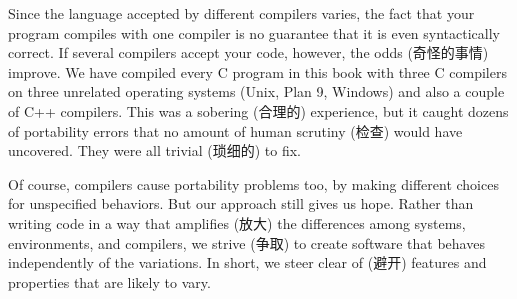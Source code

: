 Since the language accepted by different compilers varies, the fact that
your program compiles with one compiler is no guarantee that it is even
syntactically correct.  If several compilers accept your code, however, the
odds (奇怪的事情) improve. We have compiled every C program in this book
with three C compilers on three unrelated operating systems (Unix, Plan 9,
Windows) and also a couple of C++ compilers. This was a sobering (合理的)
experience, but it caught dozens of portability errors that no amount of
human scrutiny (检查) would have uncovered. They were all trivial (琐细的)
to fix.

Of course, compilers cause portability problems too, by making different
choices for unspecified behaviors. But our approach still gives us hope.
Rather than writing code in a way that amplifies (放大) the differences
among systems, environments, and compilers, we strive (争取) to create
software that behaves independently of the variations. In short, we steer
clear of (避开) features and properties that are likely to vary.
